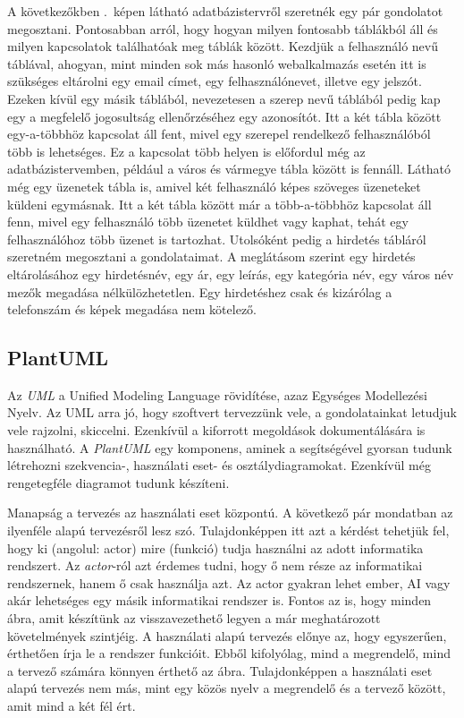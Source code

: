 \documentclass[]{thesis-ekf}
\theoremstyle{definition}
\theoremstyle{remark}
\begin{document}
	A következőkben .~képen látható adatbázistervről szeretnék egy pár gondolatot megosztani. Pontosabban arról, hogy hogyan milyen fontosabb táblákból áll és milyen kapcsolatok találhatóak meg táblák között. Kezdjük a felhasználó nevű táblával, ahogyan, mint minden sok más hasonló webalkalmazás esetén itt is szükséges eltárolni egy email címet, egy felhasználónevet, illetve egy jelszót. Ezeken kívül egy másik táblából, nevezetesen a szerep nevű táblából pedig kap egy a megfelelő jogosultság ellenőrzéséhez egy azonosítót. Itt a két tábla között egy-a-többhöz kapcsolat áll fent, mivel egy szerepel rendelkező felhasználóból több is lehetséges. Ez a kapcsolat több helyen is előfordul még az adatbázistervemben, például a város és vármegye tábla között is fennáll. Látható még egy üzenetek tábla is, amivel két felhasználó képes szöveges üzeneteket küldeni egymásnak. Itt a két tábla között már a több-a-többhöz kapcsolat áll fenn, mivel egy felhasználó több üzenetet küldhet vagy kaphat, tehát egy felhasználóhoz több üzenet is tartozhat. Utolsóként pedig a hirdetés tábláról szeretném megosztani a gondolataimat. A meglátásom szerint egy hirdetés eltárolásához egy hirdetésnév, egy ár, egy leírás, egy kategória név, egy város név mezők megadása nélkülözhetetlen. Egy hirdetéshez csak és kizárólag a telefonszám és képek megadása nem kötelező. 
	
	\subsection{PlantUML}\label{sc-plantuml}
	Az \emph{UML} a Unified Modeling Language rövidítése, azaz Egységes Modellezési Nyelv. Az UML arra jó, hogy szoftvert tervezzünk vele, a gondolatainkat letudjuk vele rajzolni, skiccelni. Ezenkívül a kiforrott megoldások dokumentálására is használható. A \emph{PlantUML} egy komponens, aminek a segítségével gyorsan tudunk létrehozni szekvencia-, használati eset- és osztálydiagramokat. Ezenkívül még rengetegféle diagramot tudunk készíteni. \cite{PlantUML}
	
	Manapság a tervezés az használati eset központú. A következő pár mondatban az ilyenféle alapú tervezésről lesz szó. Tulajdonképpen itt azt a kérdést tehetjük fel, hogy ki (angolul: actor) mire (funkció) tudja használni az adott informatika rendszert. Az \emph{actor}-ról azt érdemes tudni, hogy ő nem része az informatikai rendszernek, hanem ő csak használja azt. Az actor gyakran lehet ember, AI vagy akár lehetséges egy másik informatikai rendszer is. Fontos az is, hogy minden ábra, amit készítünk az visszavezethető legyen a már meghatározott követelmények szintjéig. A használati alapú tervezés előnye az, hogy egyszerűen, érthetően írja le a rendszer funkcióit. Ebből kifolyólag, mind a megrendelő, mind a tervező számára könnyen érthető az ábra. Tulajdonképpen a használati eset alapú tervezés nem más, mint egy közös nyelv a megrendelő és a tervező között, amit mind a két fél ért.\cite{Kusper Informatikai}
	
\end{document}
